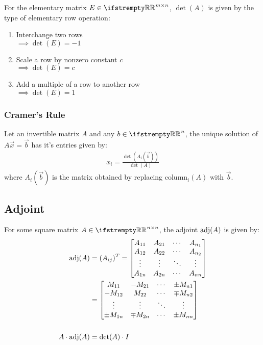 \documentclass[12pt, a4paper]{article}
\begin{document}
\begin{multicols*}{3}
For the elementary matrix $E \in \RR^{m{\times}n}$, $\det(A)$ is given by the type of elementary row operation:
\begin{enumerate}[\roman*.]
  \item Interchange two rows \\$\implies \det(E) = -1$
  \item Scale a row by nonzero constant $c$ \\$\implies \det(E) = c$
  \item Add a multiple of a row to another row \\$\implies \det(E) = 1$
\end{enumerate}

\subsubsection{Cramer's Rule}
Let an invertible matrix $A$ and any $b \in \RR^n$, the unique solution of $A\vec{x} = \vec{b}$ has it's entries given by:
\begin{align*}
  x_i = \frac{\det(A_i(\vec{b}))}{\det(A)}
\end{align*}
where $A_i(\vec{b})$ is the matrix obtained by replacing column$_i(A)$ with $\vec{b}$.

\colbreak

\subsection{Adjoint}
For some square matrix $A \in \RR^{n{\times}n}$, the adjoint $\operatorname{adj}(A)$ is given by:
\begin{align*}
  \operatorname{adj}(A) &= (A_{ij})^T = 
  \begin{bmatrix}
    A_{11} & A_{21} & \cdots & A_{n_1} \\
    A_{12} & A_{22} & \cdots & A_{n_2} \\
    \vdots & \vdots & \ddots & \vdots \\
    A_{1n} & A_{2n} & \cdots & A_{nn}
  \end{bmatrix} \\ &= 
  \begin{bmatrix}
    M_{11} & -M_{21} & \cdots & \pm M_{n1} \\
    -M_{12} & M_{22} & \cdots & \mp M_{n2} \\
    \vdots & \vdots & \ddots & \vdots \\
    \pm M_{1n} & \mp M_{2n} & \cdots & \pm M_{nn}
  \end{bmatrix} \\
  \\
  A\cdot\operatorname{adj}(A) &= \det(A)\cdot I
\end{align*}


\end{multicols*}
\end{document}
